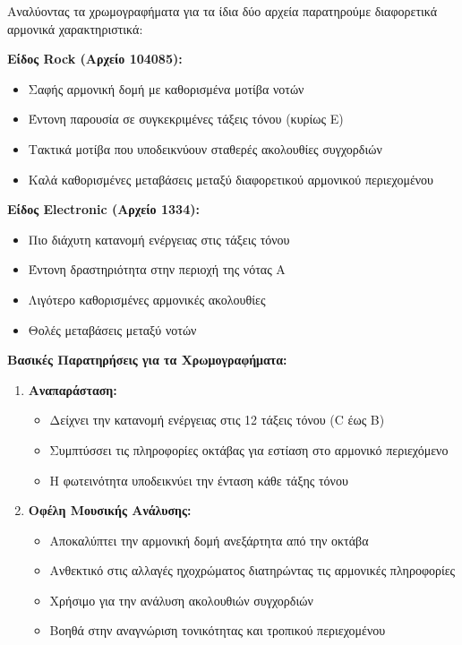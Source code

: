 \documentclass[a4paper,12pt]{article}
\begin{document}
Αναλύοντας τα χρωμογραφήματα για τα ίδια δύο αρχεία παρατηρούμε διαφορετικά αρμονικά χαρακτηριστικά:

\textbf{Είδος Rock (Αρχείο 104085):}
\begin{itemize}
    \item Σαφής αρμονική δομή με καθορισμένα μοτίβα νοτών
    \item Έντονη παρουσία σε συγκεκριμένες τάξεις τόνου (κυρίως E)
    \item Τακτικά μοτίβα που υποδεικνύουν σταθερές ακολουθίες συγχορδιών
    \item Καλά καθορισμένες μεταβάσεις μεταξύ διαφορετικού αρμονικού περιεχομένου
\end{itemize}

\textbf{Είδος Electronic (Αρχείο 1334):}
\begin{itemize}
    \item Πιο διάχυτη κατανομή ενέργειας στις τάξεις τόνου
    \item Έντονη δραστηριότητα στην περιοχή της νότας A
    \item Λιγότερο καθορισμένες αρμονικές ακολουθίες
    \item Θολές μεταβάσεις μεταξύ νοτών
\end{itemize}

\textbf{Βασικές Παρατηρήσεις για τα Χρωμογραφήματα:}
\begin{enumerate}
    \item \textbf{Αναπαράσταση:}
    \begin{itemize}
        \item Δείχνει την κατανομή ενέργειας στις 12 τάξεις τόνου (C έως B)
        \item Συμπτύσσει τις πληροφορίες οκτάβας για εστίαση στο αρμονικό περιεχόμενο
        \item Η φωτεινότητα υποδεικνύει την ένταση κάθε τάξης τόνου
    \end{itemize}
    
    \item \textbf{Οφέλη Μουσικής Ανάλυσης:}
    \begin{itemize}
        \item Αποκαλύπτει την αρμονική δομή ανεξάρτητα από την οκτάβα
        \item Ανθεκτικό στις αλλαγές ηχοχρώματος διατηρώντας τις αρμονικές πληροφορίες
        \item Χρήσιμο για την ανάλυση ακολουθιών συγχορδιών
        \item Βοηθά στην αναγνώριση τονικότητας και τροπικού περιεχομένου
    \end{itemize}
\end{enumerate}
\end{document}
